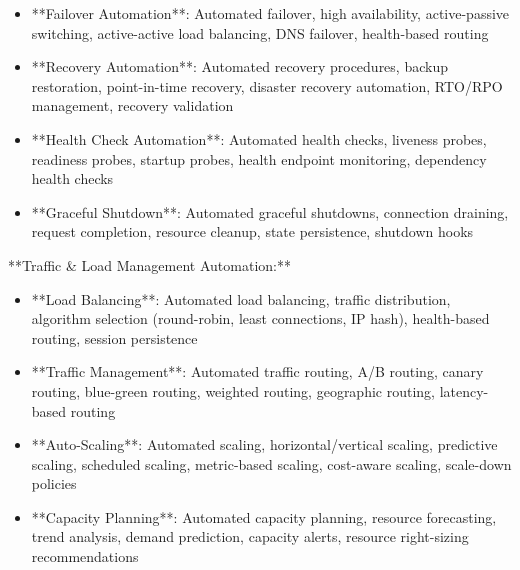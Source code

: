 \documentclass[11pt,a4paper]{article}
\begin{document}
\begin{itemize}
\item **Failover Automation**: Automated failover, high availability, active-passive switching, active-active load balancing, DNS failover, health-based routing
\end{itemize}

\begin{itemize}
\item **Recovery Automation**: Automated recovery procedures, backup restoration, point-in-time recovery, disaster recovery automation, RTO/RPO management, recovery validation
\end{itemize}

\begin{itemize}
\item **Health Check Automation**: Automated health checks, liveness probes, readiness probes, startup probes, health endpoint monitoring, dependency health checks
\end{itemize}

\begin{itemize}
\item **Graceful Shutdown**: Automated graceful shutdowns, connection draining, request completion, resource cleanup, state persistence, shutdown hooks
\end{itemize}

**Traffic \& Load Management Automation:**

\begin{itemize}
\item **Load Balancing**: Automated load balancing, traffic distribution, algorithm selection (round-robin, least connections, IP hash), health-based routing, session persistence
\end{itemize}

\begin{itemize}
\item **Traffic Management**: Automated traffic routing, A/B routing, canary routing, blue-green routing, weighted routing, geographic routing, latency-based routing
\end{itemize}

\begin{itemize}
\item **Auto-Scaling**: Automated scaling, horizontal/vertical scaling, predictive scaling, scheduled scaling, metric-based scaling, cost-aware scaling, scale-down policies
\end{itemize}

\begin{itemize}
\item **Capacity Planning**: Automated capacity planning, resource forecasting, trend analysis, demand prediction, capacity alerts, resource right-sizing recommendations
\end{itemize}
\end{document}
